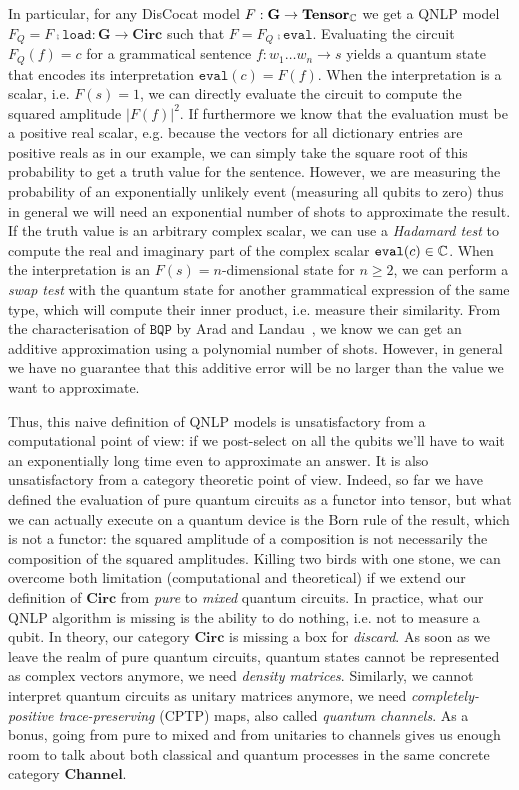 In particular, for any DisCocat model $F : \mathbf{G} \to \mathbf{Tensor}_{\mathbb{C}}$ we get a QNLP model $F_Q = F \fcmp \mathtt{load} : \mathbf{G} \to \mathbf{Circ}$ such that $F = F_Q \fcmp \mathtt{eval}$.
Evaluating the circuit $F_Q(f) = c$ for a grammatical sentence $f : w_1 \dots w_n \to s$ yields a quantum state that encodes its interpretation $\mathtt{eval}(c) = F(f)$.
When the interpretation is a scalar, i.e. $F(s) = 1$, we can directly evaluate the circuit to compute the squared amplitude $\vert F(f) \vert^2$.
If furthermore we know that the evaluation must be a positive real scalar, e.g. because the vectors for all dictionary entries are positive reals as in our example, we can simply take the square root of this probability to get a truth value for the sentence.
However, we are measuring the probability of an exponentially unlikely event (measuring all qubits to zero) thus in general we will need an exponential number of shots to approximate the result.
If the truth value is an arbitrary complex scalar, we can use a \emph{Hadamard test} to compute the real and imaginary part of the complex scalar $\mathtt{eval}(c) \in \mathbb{C}$.
When the interpretation is an $F(s) = n$-dimensional state for $n \geq 2$, we can perform a \emph{swap test} with the quantum state for another grammatical expression of the same type, which will compute their inner product, i.e. measure their similarity.
From the characterisation of $\mathtt{BQP}$ by Arad and Landau~\cite{AradLandau10}, we know we can get an additive approximation using a polynomial number of shots.
However, in general we have no guarantee that this additive error will be no larger than the value we want to approximate.

Thus, this naive definition of QNLP models is unsatisfactory from a computational point of view: if we post-select on all the qubits we'll have to wait an exponentially long time even to approximate an answer.
It is also unsatisfactory from a category theoretic point of view.
Indeed, so far we have defined the evaluation of pure quantum circuits as a functor into tensor, but what we can actually execute on a quantum device is the Born rule of the result, which is not a functor: the squared amplitude of a composition is not necessarily the composition of the squared amplitudes.
Killing two birds with one stone, we can overcome both limitation (computational and theoretical) if we extend our definition of $\mathbf{Circ}$ from \emph{pure} to \emph{mixed} quantum circuits.
In practice, what our QNLP algorithm is missing is the ability to do nothing, i.e. not to measure a qubit.
In theory, our category $\mathbf{Circ}$ is missing a box for \emph{discard}.
As soon as we leave the realm of pure quantum circuits, quantum states cannot be represented as complex vectors anymore, we need \emph{density matrices}.
Similarly, we cannot interpret quantum circuits as unitary matrices anymore, we need \emph{completely-positive trace-preserving} (CPTP) maps, also called \emph{quantum channels}.
As a bonus, going from pure to mixed and from unitaries to channels gives us enough room to talk about both classical and quantum processes in the same concrete category $\mathbf{Channel}$.

